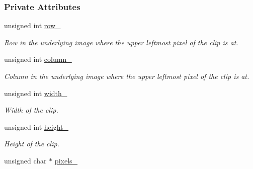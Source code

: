 \subsubsection*{Private Attributes}
\begin{CompactItemize}
\item 
\hypertarget{class_clip_5941d987375ec246785b4688705f44f1}{
unsigned int \hyperlink{class_clip_5941d987375ec246785b4688705f44f1}{row\_\-}}
\label{class_clip_5941d987375ec246785b4688705f44f1}

\begin{CompactList}\small\item\em Row in the underlying image where the upper leftmost pixel of the clip is at. \item\end{CompactList}\item 
\hypertarget{class_clip_9539a222508d1f6ff514c8aa705fd0c2}{
unsigned int \hyperlink{class_clip_9539a222508d1f6ff514c8aa705fd0c2}{column\_\-}}
\label{class_clip_9539a222508d1f6ff514c8aa705fd0c2}

\begin{CompactList}\small\item\em Column in the underlying image where the upper leftmost pixel of the clip is at. \item\end{CompactList}\item 
\hypertarget{class_clip_ba0048c33d63c40629e568d301f64f59}{
unsigned int \hyperlink{class_clip_ba0048c33d63c40629e568d301f64f59}{width\_\-}}
\label{class_clip_ba0048c33d63c40629e568d301f64f59}

\begin{CompactList}\small\item\em Width of the clip. \item\end{CompactList}\item 
\hypertarget{class_clip_eac813b06cee742c237240d9b7ccc336}{
unsigned int \hyperlink{class_clip_eac813b06cee742c237240d9b7ccc336}{height\_\-}}
\label{class_clip_eac813b06cee742c237240d9b7ccc336}

\begin{CompactList}\small\item\em Height of the clip. \item\end{CompactList}\item 
\hypertarget{class_clip_e8dc6d41fb103eaafa9bc5963ab6d826}{
unsigned char $\ast$ \hyperlink{class_clip_e8dc6d41fb103eaafa9bc5963ab6d826}{pixels\_\-}}
\label{class_clip_e8dc6d41fb103eaafa9bc5963ab6d826}


\end{CompactItemize}
